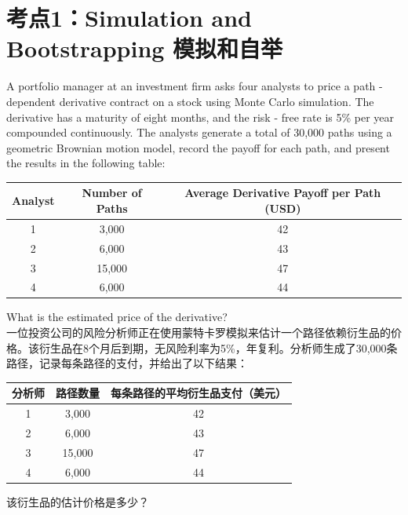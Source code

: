 \documentclass{article}
\newcounter{question} %
\begin{document}
 \tableofcontents %
\newpage

\section{考点1：Simulation and Bootstrapping 模拟和自举}
\setcounter{question}{0}
\begin{question}
    A portfolio manager at an investment firm asks four analysts to price a path - dependent derivative contract on a stock using Monte Carlo simulation. The derivative has a maturity of eight months, and the risk - free rate is 5\% per year compounded continuously. The analysts generate a total of 30,000 paths using a geometric Brownian motion model, record the payoff for each path, and present the results in the following table:
    \begin{center}
    \begin{tabular}{|c|c|c|}
    \hline
    Analyst & Number of Paths & Average Derivative Payoff per Path (USD) \\
    \hline
    1 & 3,000 & 42 \\
    \hline
    2 & 6,000 & 43 \\
    \hline
    3 & 15,000 & 47 \\
    \hline
    4 & 6,000 & 44 \\
    \hline
    \end{tabular}
    \end{center}
    What is the estimated price of the derivative?
    \\一位投资公司的风险分析师正在使用蒙特卡罗模拟来估计一个路径依赖衍生品的价格。该衍生品在8个月后到期，无风险利率为5\%，年复利。分析师生成了30,000条路径，记录每条路径的支付，并给出了以下结果：
    \begin{center}
        \begin{tabular}{|c|c|c|}
        \hline
        分析师 & 路径数量 & 每条路径的平均衍生品支付（美元） \\
        \hline
        1 & 3,000 & 42 \\
        \hline
        2 & 6,000 & 43 \\
        \hline
        3 & 15,000 & 47 \\
        \hline
        4 & 6,000 & 44 \\
        \hline
        \end{tabular}
        \end{center}
        该衍生品的估计价格是多少？
    \end{question}
    
\end{document}
